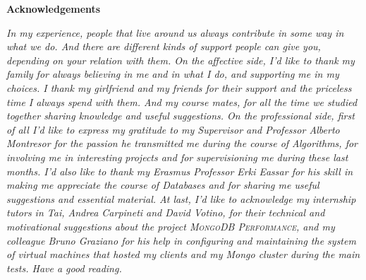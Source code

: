 \thispagestyle{empty}

\begin{center}
  {\bf \Huge Acknowledgements}
\end{center}

\vspace{4cm}


\emph{
 In my experience, people that live around us always contribute in some way in what we do. %
And there are different kinds of support people can give you, depending on your relation with them. 
On the affective side, I’d like to thank my family for always believing in me and in what I do, and supporting me in my choices.
I thank my girlfriend and my friends for their support and the priceless time I always spend with them. And my course mates, for all the time we studied together sharing knowledge and useful suggestions.
On the professional side, first of all I’d like to express my gratitude to my Supervisor and Professor Alberto Montresor for the passion he transmitted me during the course of Algorithms, for involving me in interesting projects and for supervisioning me during these last months.
I’d also like to thank my Erasmus Professor Erki Eassar for his skill in making me appreciate the course of Databases and for sharing me useful suggestions and essential material.
At last, I’d like to acknowledge my internship tutors in Tai, Andrea Carpineti and David Votino, for their technical and motivational suggestions about the project \textsc{MongoDB Performance}, and my colleague Bruno Graziano for his help in configuring and maintaining the system of virtual machines that hosted my clients and my Mongo cluster during the main tests. 
Have a good reading.
}

